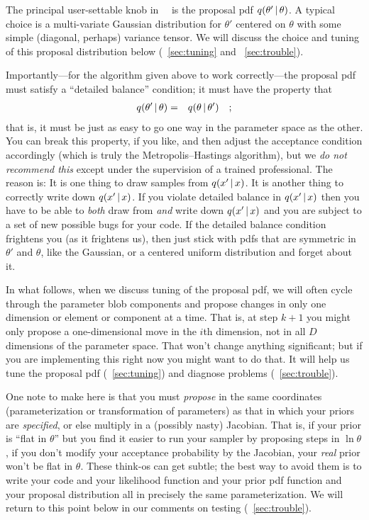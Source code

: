 \documentclass[12pt,twoside,pdftex]{article}
\newcommand{\MCMC}{\acronym{MCMC}}
\newcommand{\MH}{\acronym{M--H}}
\newcommand{\pars}{\theta}
\begin{document}
The principal user-settable knob in \MH\ \MCMC\ is the proposal
  pdf $q(\pars'\given\pars)$.
A typical choice is a multi-variate Gaussian distribution for $\pars'$
  centered on $\pars$ with some simple (diagonal, perhaps) variance
  tensor.
We will discuss the choice and tuning of this proposal distribution
  below (\sectionname~\ref{sec:tuning} and \sectionname~\ref{sec:trouble}).

Importantly---for the algorithm given above to work correctly---the
  proposal pdf must satisfy a ``detailed balance'' condition; it
  must have the property that
\begin{eqnarray}
q(\pars'\given\pars) &=& q(\pars\given\pars')
\quad ;
\end{eqnarray}
that is, it must be just as easy to go one way in the parameter space
  as the other.
You can break this property, if you like, and then adjust the
  acceptance condition accordingly (which is truly the Metropolis--Hastings algorithm), but we \emph{do not recommend this}
  except under the supervision of a trained professional.
The reason is:  It is one thing to draw samples from $q(x'\,|\, x)$.
It is another thing to correctly write down $q(x'\,|\, x)$.
  If you violate detailed balance in $q(x'\,|\, x)$ then you have to be
  able to \emph{both} draw from \emph{and} write down $q(x'\,|\, x)$
  and you are subject to a set of new possible bugs for your code.
If the detailed balance condition frightens you (as it frightens us),
  then just stick with pdfs that are symmetric in $\pars'$ and $\pars$,
  like the Gaussian, or a centered uniform distribution and forget about
  it.

In what follows, when we discuss tuning of the proposal pdf, we will
  often cycle through the parameter blob components and propose changes
  in only one dimension or element or component at a time.
That is, at step $k+1$ you might only propose a one-dimensional move
  in the $i$th dimension, not in all $D$ dimensions of the parameter
  space.
That won't change anything significant; but if you are implementing
  this right now you might want to do that.
It will help us tune the proposal pdf (\sectionname~\ref{sec:tuning})
and diagnose problems (\sectionname~\ref{sec:trouble}).

One note to make here
  is that you must \emph{propose}
  in the same coordinates (parameterization or transformation of parameters)
  as that in which your priors are \emph{specified},
  or else multiply in a (possibly nasty) Jacobian.
That is, if your prior is ``flat in $\pars$''
  but you find it easier to run your sampler by proposing steps in $\ln \pars$,
  if you don't modify your acceptance probability by the Jacobian,
  your \emph{real} prior won't be flat in $\pars$.
These think-os can get subtle;
  the best way to avoid them
  is to write your code and your likelihood function
  and your prior pdf function and your proposal distribution
  all in precisely the same parameterization.
We will return to this point below in our comments on testing (\sectionname~\ref{sec:trouble}).
\end{document}
